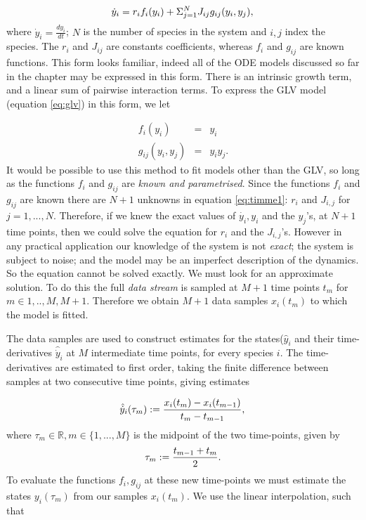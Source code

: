 \begin{equation}\label{eq:timme1}
 \dot{y}_i = r_if_i(y_i) + \Sigma_{j=1}^{N}J_{ij}g_{ij}(y_i,y_j),\\
\end{equation}
%
where $\dot{y}_i = \frac{dy_{i}}{dt}$; $N$ is the number of species in the system and $i,j$ index the species. The $r_i$ and $J_{ij}$ are constants coefficients, whereas $f_i$ and $g_{ij}$ are known functions. This form looks familiar, indeed all of the ODE models discussed so far in the chapter may be expressed in this form. There is an intrinsic growth term, and a linear sum of pairwise interaction terms. To express the GLV model (equation \ref{eq:glv}) in this form, we let

\begin{eqnarray}
f_i(y_i) &=& y_i \\
g_{ij}(y_i,y_j) &=& y_iy_j.
\end{eqnarray}
%
It would be possible to use this method to fit models other than the GLV, so long as the functions $f_i$ and $g_{ij}$ are \emph{known and parametrised}. Since the functions $f_i$ and $g_{ij}$ are known there are $N+1$ unknowns in equation \eqref{eq:timme1}: $r_i$ and $J_{i,j}$ for $j=1,...,N$. Therefore, if we knew the exact values of $\dot{y_i},y_i$ and the $y_j$'s, at $N+1$ time points, then we could solve the equation for $r_i$ and the $J_{i,j}$'s. However in any practical application our knowledge of the system is not \emph{exact}; the system is subject to noise; and the model may be an imperfect description of the dynamics. So the equation cannot be solved exactly. We must look for an approximate solution. To do this the full \emph{data stream} is sampled at $M+1$ time points $t_m$ for $m \in {1,..,M,M+1}$. Therefore we obtain $M+1$ data samples $x_i(t_m)$ to which the model is fitted. 

The data samples are used to construct estimates for the states($\hat{y}_i$ and their time-derivatives $\hat{\dot{y}}_i$ at $M$ intermediate time points, for every species $i$. The time-derivatives are estimated to first order, taking the finite difference between samples at two consecutive time points, giving estimates

\begin{equation}\label{eq:timme2}
\hat{\dot{y}}_{i}(\tau_m) := \frac{x_i(t_m) - x_i(t_{m-1})}{t_m - t_{m-1}},\\
\end{equation}
%
where $\tau_m \in{\mathbb{R}}, m \in{\{1,...,M\}}$ is the midpoint of the two time-points, given by
%
\begin{equation}\label{eq:timme3}
\tau_m := \frac{t_{m-1} + t_{m}}{2}.\\
\end{equation}
%
To evaluate the functions $f_i, g_{ij}$ at these new time-points we must estimate the states $y_i(\tau_m)$ from our samples $x_i(t_m)$. We use the linear interpolation, such that

